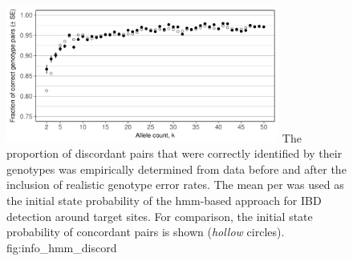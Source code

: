 

\begin{figure}[!htb]
\centering
\includegraphics[width=0.8\textwidth]{./img/ch5/info_hmm_discord}
%
{The proportion of discordant pairs that were correctly identified by their genotypes was empirically determined from data before and after the inclusion of realistic genotype error rates.
The mean per \fk{} was used as the initial state probability of the \gls{hmm}-based approach for IBD detection around target sites.
For comparison, the initial state probability of concordant pairs is shown (\emph{hollow} circles).}%
{fig:info_hmm_discord}
\end{figure}
